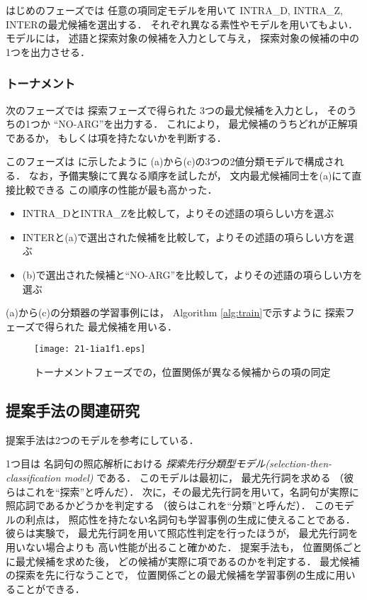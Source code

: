 \documentclass[japanese]{jnlp_1.4}
\newcommand{\figref}[1]{}
\begin{document}
はじめのフェーズでは
任意の項同定モデルを用いて
INTRA\_D, INTRA\_Z, INTERの最尤候補を選出する．
それぞれ異なる素性やモデルを用いてもよい．
モデルには，
述語と探索対象の候補を入力として与え，
探索対象の候補の中の1つを出力させる．


\subsubsection{トーナメント}

次のフェーズでは
探索フェーズで得られた
3つの最尤候補を入力とし，
そのうちの1つか
``NO-ARG''を出力する．
これにより，
最尤候補のうちどれが正解項であるか，
もしくは項を持たないかを判断する．

このフェーズは
\figref{fig:anap-tournament-model}に示したように
(a)から(c)の3つの2値分類モデルで構成される．
なお，予備実験にて異なる順序を試したが，
文内最尤候補同士を(a)にて直接比較できる
この順序の性能が最も高かった．

\begin{itemize}
	  \setlength{\parskip}{0cm} 
	    \setlength{\itemsep}{0cm} 
\item[(a) ] INTRA\_DとINTRA\_Zを比較して，よりその述語の項らしい方を選ぶ

\item[(b) ] INTERと(a)で選出された候補を比較して，よりその述語の項らしい方を選ぶ

\item[(c) ] (b)で選出された候補と``NO-ARG''を比較して，よりその述語の項らしい方を選ぶ

\end{itemize}


(a)から(c)の分類器の学習事例には，
Algorithm \ref{alg:train}で示すように
探索フェーズで得られた
最尤候補を用いる．

\begin{figure}[t]
\begin{center}
\texttt{[image: 21-1ia1f1.eps]}
\end{center}
\caption{トーナメントフェーズでの，位置関係が異なる候補からの項の同定}
\label{fig:anap-tournament-model}
\end{figure}



\subsection{提案手法の関連研究}
提案手法は2つのモデルを参考にしている．

1つ目は
名詞句の照応解析における
\emph{探索先行分類型モデル(selection-then-classification model)} \cite{Iida:2005:TALIP}である．
このモデルは最初に，
最尤先行詞を求める
（彼らはこれを``探索''と呼んだ）．
次に，その最尤先行詞を用いて，名詞句が実際に照応詞であるかどうかを判定する
（彼らはこれを``分類''と呼んだ）．
このモデルの利点は，
照応性を持たない名詞句も学習事例の生成に使えることである．
彼らは実験で，
最尤先行詞を用いて照応性判定を行ったほうが，
最尤先行詞を用いない場合よりも
高い性能が出ること確かめた．
提案手法も，
位置関係ごとに最尤候補を求めた後，
どの候補が実際に項であるのかを判定する．
最尤候補の探索を先に行なうことで，
位置関係ごとの最尤候補を学習事例の生成に用いることができる．
\end{document}
